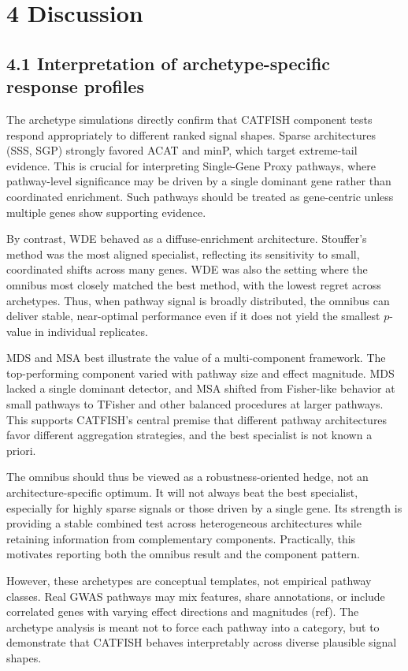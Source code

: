 \documentclass[unnumsec,webpdf,contemporary,large]{oup-authoring-template}%
\theoremstyle{thmstyleone}%
\theoremstyle{thmstyletwo}%
\theoremstyle{thmstylethree}%
\begin{document}
\section{4 Discussion}

\subsection*{4.1 Interpretation of archetype-specific response profiles}

The archetype simulations directly confirm that CATFISH component tests respond appropriately to different ranked signal shapes. Sparse architectures (SSS, SGP) strongly favored ACAT and minP, which target extreme-tail evidence. This is crucial for interpreting Single-Gene Proxy pathways, where pathway-level significance may be driven by a single dominant gene rather than coordinated enrichment. Such pathways should be treated as gene-centric unless multiple genes show supporting evidence.

By contrast, WDE behaved as a diffuse-enrichment architecture. Stouffer's method was the most aligned specialist, reflecting its sensitivity to small, coordinated shifts across many genes. WDE was also the setting where the omnibus most closely matched the best method, with the lowest regret across archetypes. Thus, when pathway signal is broadly distributed, the omnibus can deliver stable, near-optimal performance even if it does not yield the smallest \(p\)-value in individual replicates.

MDS and MSA best illustrate the value of a multi-component framework. The top-performing component varied with pathway size and effect magnitude. MDS lacked a single dominant detector, and MSA shifted from Fisher-like behavior at small pathways to TFisher and other balanced procedures at larger pathways. This supports CATFISH’s central premise that different pathway architectures favor different aggregation strategies, and the best specialist is not known a priori.

The omnibus should thus be viewed as a robustness-oriented hedge, not an architecture-specific optimum. It will not always beat the best specialist, especially for highly sparse signals or those driven by a single gene. Its strength is providing a stable combined test across heterogeneous architectures while retaining information from complementary components. Practically, this motivates reporting both the omnibus result and the component pattern.

However, these archetypes are conceptual templates, not empirical pathway classes. Real GWAS pathways may mix features, share annotations, or include correlated genes with varying effect directions and magnitudes (ref). The archetype analysis is meant not to force each pathway into a category, but to demonstrate that CATFISH behaves interpretably across diverse plausible signal shapes.
\end{document}
